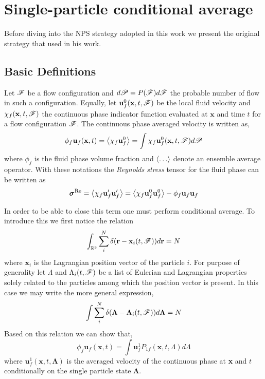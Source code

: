 
\section{Single-particle conditional average}

Before diving into the NPS strategy adopted in this work we present the original strategy that \citet{van1982bubble} used in his work. 

\subsection{Basic Definitions}
Let $\mathscr{F}$ be a flow configuration and $d\mathscr{P} = P(\mathscr{F})d\mathscr{F}$ the probable number of flow in such a configuration. 
Equally, let $\textbf{u}_f^0(\textbf{x},t,\mathscr{F})$ be the local fluid velocity and $\chi_f(\textbf{x},t,\mathscr{F})$ the continuous phase indicator function evaluated at $\textbf{x}$ and time $t$ for a flow configuration $\mathscr{F}$. 
The continuous phase averaged velocity is written as, 
\begin{equation}
    \phi_f \textbf{u}_f(\textbf{x},t)
    = \left<\chi_f \textbf{u}_f^0\right> 
    = \int  \chi_f \textbf{u}_f^0(\textbf{x},t,\mathscr{F}) d\mathscr{P}
\end{equation}
where $\phi_f$ is the fluid phase volume fraction and $\left<\ldots\right>$ denote an ensemble average operator. 
With these notations the \textit{Reynolds stress} tensor for the fluid phase can be written as 
\begin{equation}
    \bm\sigma^\text{Re}
    =\left<\chi_f \textbf{u}_f'\textbf{u}_f'\right>
    =\left<\chi_f \textbf{u}_f^0 \textbf{u}_f^0 \right>
    - \phi_f \textbf{u}_f \textbf{u}_f
\end{equation}

In order to be able to close this term one must perform conditional average. 
To introduce this we first notice the relation 
\begin{equation}
    \int_{\mathbb{R}^3}
    \sum_i^N \delta(\textbf{r}-\textbf{x}_i(t,\mathscr{F}))
    d\textbf{r}
    = N 
\end{equation}
where $\textbf{x}_i$ is the Lagrangian position vector of the particle $i$. 
For purpose of generality let $\Lambda$ and $\Lambda_i(t,\mathscr{F})$ be a list of Eulerian and Lagrangian properties solely related to the particles among which the position vector is present. 
In this case we may write the more general expression, 
\begin{equation}
    \int
    \sum_i^N \delta(\bm\Lambda-\bm\Lambda_i(t,\mathscr{F}))
    d\bm\Lambda
    = N 
\end{equation}
Based on this relation we can show that, 
\begin{equation}
    \phi_f \textbf{u}_f(\textbf{x},t)
    = 
    \int 
    \textbf{u}^1_f 
    P_{1f}(\textbf{x},t,\Lambda)
    d\Lambda
\end{equation}
where $\textbf{u}^1_f(\textbf{x},t,\bm\Lambda)$ is the averaged velocity of the continuous phase at \textbf{x} and $t$ conditionally on the single particle state $\bm\Lambda$. 

